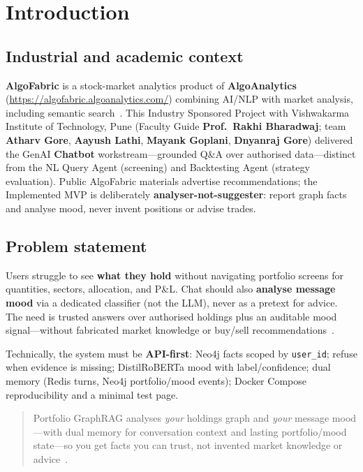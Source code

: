 \chapter{Introduction}
\label{ch:introduction}
\label{ch:company}
\label{ch:problem}
\label{ch:finance}

\section{Industrial and academic context}

\textbf{AlgoFabric} is a stock-market analytics product of \textbf{AlgoAnalytics} (\url{https://algofabric.algoanalytics.com/}) combining AI/NLP with market analysis, including semantic search~\cite{algofabric-web,algoanalytics-products}. This Industry Sponsored Project with Vishwakarma Institute of Technology, Pune (Faculty Guide \textbf{Prof.\ Rakhi Bharadwaj}; team \textbf{Atharv Gore}, \textbf{Aayush Lathi}, \textbf{Mayank Goplani}, \textbf{Dnyanraj Gore}) delivered the GenAI \textbf{Chatbot} workstream---grounded Q\&A over authorised data---distinct from the NL Query Agent (screening) and Backtesting Agent (strategy evaluation). Public AlgoFabric materials advertise recommendations; the Implemented MVP is deliberately \textbf{analyser-not-suggester}: report graph facts and analyse mood, never invent positions or advise trades.

\section{Problem statement}

Users struggle to see \textbf{what they hold} without navigating portfolio screens for quantities, sectors, allocation, and P\&L. Chat should also \textbf{analyse message mood} via a dedicated classifier (not the LLM), never as a pretext for advice. The need is trusted answers over authorised holdings plus an auditable mood signal---without fabricated market knowledge or buy/sell recommendations~\cite{prd}.

Technically, the system must be \textbf{API-first}: Neo4j facts scoped by \texttt{user\_id}; refuse when evidence is missing; DistilRoBERTa mood with label/confidence; dual memory (Redis turns, Neo4j portfolio/mood events); Docker Compose reproducibility and a minimal test page.

\begin{quote}
Portfolio GraphRAG analyses \emph{your} holdings graph and \emph{your} message mood---with dual memory for conversation context and lasting portfolio/mood state---so you get facts you can trust, not invented market knowledge or advice~\cite{prd}.
\end{quote}

